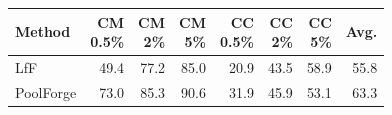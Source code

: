 \begin{tabular}[t]{@{}lrrrrrrr@{}}
\toprule
Method & \shortstack{CM\\0.5\%} & \shortstack{CM\\2\%} & \shortstack{CM\\5\%} & \shortstack{CC\\0.5\%} & \shortstack{CC\\2\%} & \shortstack{CC\\5\%} & Avg. \\
\midrule
LfF & 49.4 & 77.2 & 85.0 & 20.9 & 43.5 & 58.9 & 55.8 \\
PoolForge & 73.0 & 85.3 & 90.6 & 31.9 & 45.9 & 53.1 & 63.3 \\
\bottomrule
\end{tabular}
